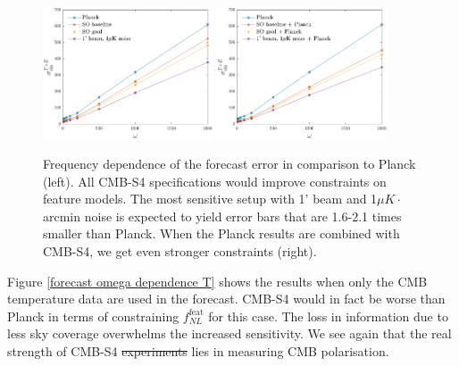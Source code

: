 \documentclass[a4paper,12pt,times,custombib,print,index]{Classes/PhDThesisPSnPDF} %
\providecommand{\DIFadd}[1]{{\protect\color{blue}\uwave{#1}}} %
\providecommand{\DIFdel}[1]{{\protect\color{red}\sout{#1}}}                      %
\providecommand{\DIFaddbegin}{} %
\providecommand{\DIFaddend}{} %
\providecommand{\DIFdelbegin}{} %
\providecommand{\DIFdelend}{} %
\newcommand{\DIFscaledelfig}{0.5}
\newlength{\DIFdelgraphicswidth} %
\newlength{\DIFdelgraphicsheight} %
\newcommand{\DIFaddincludegraphics}[2][]{{\color{blue}\fbox{\DIFOincludegraphics[#1]{#2}}}} %
\newcommand{\DIFdelincludegraphics}[2][]{%
\sbox{\DIFdelgraphicsbox}{\DIFOincludegraphics[#1]{#2}}%
\settoboxwidth{\DIFdelgraphicswidth}{\DIFdelgraphicsbox} %
\settoboxtotalheight{\DIFdelgraphicsheight}{\DIFdelgraphicsbox} %
\scalebox{\DIFscaledelfig}{%
\parbox[b]{\DIFdelgraphicswidth}{\usebox{\DIFdelgraphicsbox}\\[-\baselineskip] \rule{\DIFdelgraphicswidth}{0em}}\llap{\resizebox{\DIFdelgraphicswidth}{\DIFdelgraphicsheight}{%
\setlength{\unitlength}{\DIFdelgraphicswidth}%
\begin{picture}(1,1)%
\thicklines\linethickness{2pt} %
{\color[rgb]{1,0,0}\put(0,0){\framebox(1,1){}}}%
{\color[rgb]{1,0,0}\put(0,0){\line( 1,1){1}}}%
{\color[rgb]{1,0,0}\put(0,1){\line(1,-1){1}}}%
\end{picture}%
}\hspace*{3pt}}} %
} %
\DeclareRobustCommand{\DIFaddbegin}{\DIFOaddbegin \let\includegraphics\DIFaddincludegraphics} %
\DeclareRobustCommand{\DIFaddend}{\DIFOaddend \let\includegraphics\DIFOincludegraphics} %
\DeclareRobustCommand{\DIFdelbegin}{\DIFOdelbegin \let\includegraphics\DIFdelincludegraphics} %
\DeclareRobustCommand{\DIFdelend}{\DIFOaddend \let\includegraphics\DIFOincludegraphics} %
\begin{document}
\begin{figure}[ht]
	\centering
	\includegraphics[width=0.45\textwidth]{omega_dependence_pol.pdf}
	\includegraphics[width=0.45\textwidth]{omega_dependence_combined_pol.pdf}
	\caption{Frequency dependence of the forecast error in comparison to Planck (left). All CMB-S4 specifications would improve constraints on feature models. The most sensitive setup with 1' beam and 1$\mu K \cdot$arcmin noise is expected to yield error bars that are 1.6-2.1 times smaller than Planck. When the Planck results are combined with CMB-S4, we get even stronger constraints (right).}
	\label{forecast omega dependence pol}
\end{figure}

Figure \ref{forecast omega dependence T} shows the results when only the CMB temperature data are used in the forecast. CMB-S4 would in fact be worse than Planck in terms of constraining \DIFdelbegin \DIFdel{$f_{NL}^\text{feat}$ }\DIFdelend \DIFaddbegin \DIFadd{$f_\text{NL}^\text{feat}$ }\DIFaddend for this case. The loss in information due to less sky coverage overwhelms the increased sensitivity. We see again that the real strength of CMB-S4 \DIFdelbegin \DIFdel{experiments }\DIFdelend lies in measuring CMB polarisation.
\end{document}
